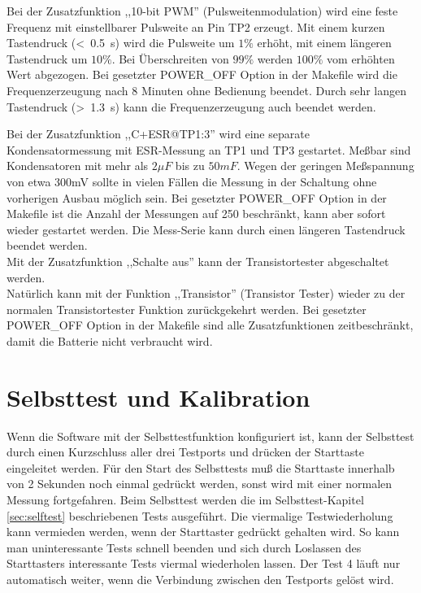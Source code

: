 Bei der Zusatzfunktion ,,10-bit PWM'' (Pulsweitenmodulation) wird eine feste Frequenz mit einstellbarer Pulsweite an Pin TP2 erzeugt.
Mit einem kurzen Tastendruck (\textless~0.5~s) wird die Pulsweite um \(1 \%\) erhöht, mit einem längeren Tastendruck um \(10 \%\).
Bei Überschreiten von \(99 \%\) werden \(100 \%\) vom erhöhten Wert abgezogen.
Bei gesetzter POWER\_OFF Option in der Makefile wird die Frequenzerzeugung nach 8 Minuten ohne Bedienung beendet.
Durch sehr langen Tastendruck (\textgreater~1.3~s) kann die Frequenzerzeugung auch beendet werden.

Bei der Zusatzfunktion ,,C+ESR@TP1:3'' wird eine separate Kondensatormessung mit ESR-Messung an TP1 und TP3 gestartet.
Meßbar sind Kondensatoren mit mehr als \(2 \mu F\) bis zu \(50 mF\). Wegen der geringen Meßspannung von etwa 300mV sollte
in vielen Fällen die Messung in der Schaltung ohne vorherigen Ausbau möglich sein.
Bei gesetzter POWER\_OFF Option in der Makefile ist die Anzahl der Messungen auf 250 beschränkt,
kann aber sofort wieder gestartet werden.
Die Mess-Serie kann durch einen längeren Tastendruck  beendet werden.\\

Mit der Zusatzfunktion ,,Schalte aus'' kann der Transistortester abgeschaltet werden.\\

Natürlich kann mit der Funktion ,,Transistor'' (Transistor Tester) wieder zu der normalen Transistortester Funktion
zurückgekehrt werden.
Bei gesetzter POWER\_OFF Option in der Makefile sind alle Zusatzfunktionen zeitbeschränkt, damit die Batterie nicht verbraucht wird.

\section{Selbsttest und Kalibration}

Wenn die Software mit der Selbsttestfunktion konfiguriert ist, kann der Selbsttest durch einen Kurzschluss aller drei
Testports und drücken der Starttaste eingeleitet werden.
Für den Start des Selbsttests muß die Starttaste innerhalb von 2 Sekunden noch einmal gedrückt werden,
sonst wird mit einer normalen Messung fortgefahren.
Beim Selbsttest werden die im Selbsttest-Kapitel \ref{sec:selftest} beschriebenen Tests ausgeführt.
Die viermalige Testwiederholung kann vermieden werden, wenn der Starttaster gedrückt gehalten wird.
So kann man uninteressante Tests schnell beenden und
sich durch Loslassen des Starttasters interessante Tests viermal wiederholen lassen.
Der Test 4 läuft nur automatisch weiter, wenn die Verbindung zwischen den Testports gelöst wird.

